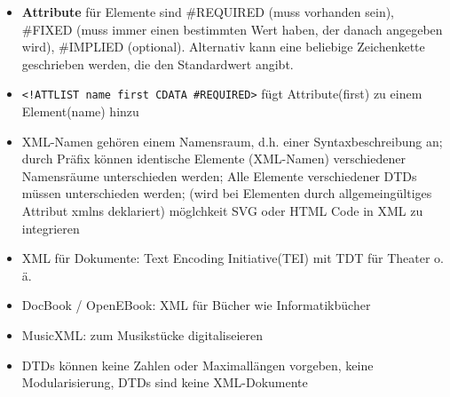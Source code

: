 \documentclass[12pt,landscape]{article}
\begin{document}
\begin{multicols}{3}
\begin{itemize}
\item \textbf{Attribute} für Elemente sind \#REQUIRED (muss vorhanden sein), \#FIXED (muss immer einen bestimmten Wert haben, der danach angegeben wird), \#IMPLIED (optional). Alternativ kann eine beliebige Zeichenkette geschrieben werden, die den Standardwert angibt.
\item \lstinline{<!ATTLIST name first CDATA #REQUIRED>} fügt Attribute(first) zu einem Element(name) hinzu
\item XML-Namen gehören einem Namensraum, d.h. einer Syntaxbeschreibung an; durch Präfix können identische Elemente (XML-Namen) verschiedener Namensräume unterschieden werden; Alle Elemente verschiedener DTDs müssen unterschieden werden; (wird bei Elementen durch allgemeingültiges Attribut xmlns deklariert) möglchkeit SVG oder HTML Code in XML zu integrieren
\item XML für Dokumente: Text Encoding Initiative(TEI) mit TDT für Theater o. ä. 
\item DocBook / OpenEBook: XML für Bücher wie Informatikbücher
\item MusicXML: zum Musikstücke digitaliseieren
\item DTDs können keine Zahlen oder Maximallängen vorgeben, keine Modularisierung, DTDs sind keine XML-Dokumente
\end{itemize}



\end{multicols}
\end{document}
